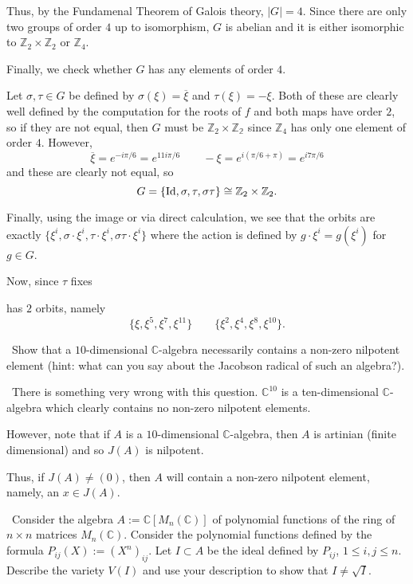 \documentclass[12pt]{AlgebraQual}
\begin{document}
\begin{solution}
Thus, by the Fundamenal Theorem of Galois theory, $|G|=4$. Since there are only two groups of order $4$ up to isomorphism, $G$ is abelian and it is either isomorphic to $\mathbb{Z}_2\times\mathbb{Z}_2$ or $\mathbb{Z}_4$.

Finally, we check whether $G$ has any elements of order $4$.

Let $\sigma,\tau\in G$ be defined by $\sigma(\xi)=\overline{\xi}$ and $\tau(\xi)=-\xi$. Both of these are clearly well defined by the computation for the roots of $f$ and both maps have order $2$, so if they are not equal, then $G$ must be $\mathbb{Z}_2\times\mathbb{Z_2}$ since $\mathbb{Z}_4$ has only one element of order $4.$ However, $$\overline{\xi}=e^{-i\pi/6}=e^{11i\pi/6}\qquad -\xi=e^{i(\pi/6+\pi)}=e^{i7\pi/6}$$ and these are clearly not equal, so $$G=\{\text{Id},\sigma,\tau,\sigma\tau\}\cong\mathbb{Z}_2\times\mathbb{Z}_2.$$

Finally, using the image or via direct calculation, we see that the orbits are exactly $\{\xi^i,\sigma\cdot\xi^i,\tau\cdot\xi^i,\sigma\tau\cdot\xi^i\}$ where the action is defined by $g\cdot \xi^i=g(\xi^i)$ for $g\in G$.

Now, since $\tau$ fixes

has $2$ orbits, namely $$\{\xi,\xi^5,\xi^7,\xi^{11}\}\qquad \{\xi^2,\xi^4,\xi^8,\xi^{10}\}.$$
\end{solution}
\newpage




\begin{problem} $\,$
Show that a $10$-dimensional $\mathbb{C}$-algebra necessarily contains a non-zero nilpotent element (hint: what can you say about the Jacobson radical of such an algebra?).
\end{problem}


\begin{solution}$\,$
There is something very wrong with this question. $\mathbb{C}^{10}$ is a ten-dimensional $\mathbb{C}$-algebra which clearly contains no non-zero nilpotent elements.

However, note that if $A$ is a $10$-dimensional $\mathbb{C}$-algebra, then $A$ is artinian (finite dimensional) and so $J(A)$ is nilpotent.

Thus, if $J(A)\not=(0)$, then $A$ will contain a non-zero nilpotent element, namely, an $x\in J(A)$.
\end{solution}
\newpage



\begin{problem} $\,$
Consider the algebra $A:=\mathbb{C}[M_n(\mathbb{C})]$ of polynomial functions of the ring of $n\times n$ matrices $M_n(\mathbb{C})$. Consider the polynomial functions defined by the formula $P_{ij}(X):=(X^n)_{ij}$. Let $I\subset A$ be the ideal defined by $P_{ij}$, $1\le i,j\le n.$ Describe the variety $V(I)$ and use your description to show that $I\not=\sqrt{I}.$
\end{problem}
\end{document}
